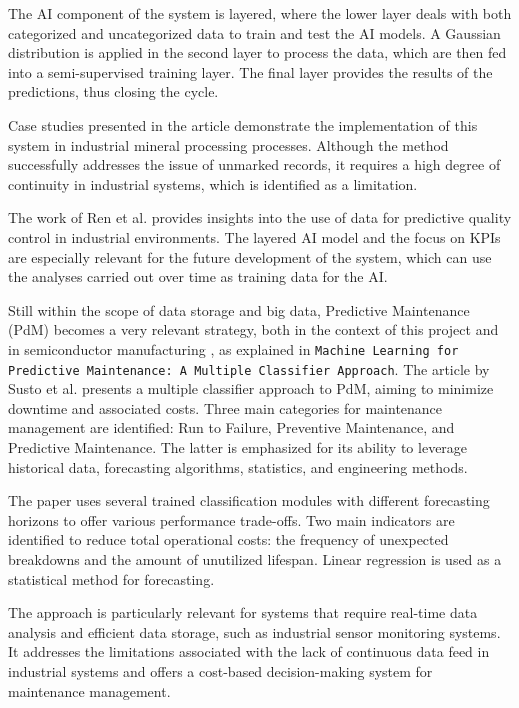 The \gls{AI} component of the system is layered, where the lower layer deals with both categorized and uncategorized data to train and test the AI models. A Gaussian distribution is applied in the second layer to process the data, which are then fed into a semi-supervised training layer. The final layer provides the results of the predictions, thus closing the cycle.

Case studies presented in the article demonstrate the implementation of this system in industrial mineral processing processes. Although the method successfully addresses the issue of unmarked records, it requires a high degree of continuity in industrial systems, which is identified as a limitation.

The work of Ren et al. provides insights into the use of data for predictive quality control in industrial environments. The layered \gls{AI} model and the focus on KPIs are especially relevant for the future development of the system, which can use the analyses carried out over time as training data for the \gls{AI}.

Still within the scope of data storage and big data, Predictive Maintenance (PdM) becomes a very relevant strategy, both in the context of this project and in semiconductor manufacturing \cite{susto2015machine}, as explained in \texttt{Machine Learning for Predictive Maintenance: A Multiple Classifier Approach}. The article by Susto et al.\cite{susto2015machine} presents a multiple classifier approach to PdM, aiming to minimize downtime and associated costs. Three main categories for maintenance management are identified: Run to Failure, Preventive Maintenance, and Predictive Maintenance. The latter is emphasized for its ability to leverage historical data, forecasting algorithms, statistics, and engineering methods.

The paper uses several trained classification modules with different forecasting horizons to offer various performance trade-offs. Two main indicators are identified to reduce total operational costs: the frequency of unexpected breakdowns and the amount of unutilized lifespan. Linear regression is used as a statistical method for forecasting.

The approach is particularly relevant for systems that require real-time data analysis and efficient data storage, such as industrial sensor monitoring systems. It addresses the limitations associated with the lack of continuous data feed in industrial systems and offers a cost-based decision-making system for maintenance management.


